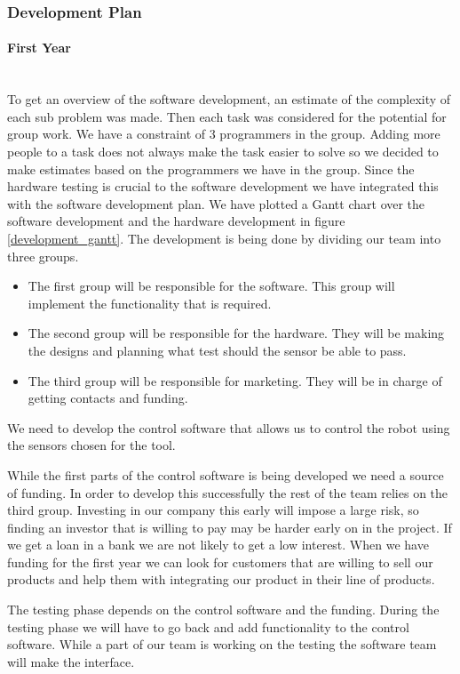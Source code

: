 \subsubsection{Development Plan}
\paragraph*{First Year}~\\
To get an overview of the software development, an estimate of the complexity of each sub problem was made.
Then each task was considered for the potential for group work.
We have a constraint of 3 programmers in the group.
Adding more people to a task does not always make the task easier to solve so we decided to make estimates based on the programmers we have in the group.
Since the hardware testing is crucial to the software development we have integrated this with the software development plan. 
We have plotted a Gantt chart over the software development and the hardware development in figure \ref{development_gantt}.
The development is being done by dividing our team into three groups. 

\begin{itemize}
\item The first group will be responsible for the software. 
This group will implement the functionality that is required.
\item The second group will be responsible for the hardware. 
They will be making the designs and planning what test should the sensor be able to pass.
\item The third group will be responsible for marketing. 
They will be in charge of getting contacts and funding. 
\end{itemize}

We need to develop the control software that allows us to control the robot using the sensors chosen for the tool. 

While the first parts of the control software is being developed we need a source of funding.
In order to develop this successfully the rest of the team relies on the third group.
Investing in our company this early will impose a large risk, so finding an investor that is willing to pay may be harder early on in the project. 
If we get a loan in a bank we are not likely to get a low interest.
When we have funding for the first year we can look for customers that are willing to sell our products and help them with integrating our product in their line of products.

The testing phase depends on the control software and the funding. 
During the testing phase we will have to go back and add functionality to the control software. 
While a part of our team is working on the testing the software team will make the interface.

